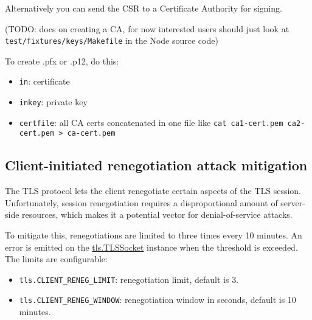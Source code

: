 Alternatively you can send the CSR to a Certificate Authority for
signing.

(TODO: docs on creating a CA, for now interested users should just look
at \texttt{test/fixtures/keys/Makefile} in the Node source code)

To create .pfx or .p12, do this:

\begin{Shaded}
\begin{Highlighting}[]
   \NormalTok{\textbackslash{}}
     
\end{Highlighting}
\end{Shaded}

\begin{itemize}
\item
  \texttt{in}: certificate
\item
  \texttt{inkey}: private key
\item
  \texttt{certfile}: all CA certs concatenated in one file like
  \texttt{cat ca1-cert.pem ca2-cert.pem \textgreater{} ca-cert.pem}
\end{itemize}

\subsection{Client-initiated renegotiation attack mitigation}

The TLS protocol lets the client renegotiate certain aspects of the TLS
session. Unfortunately, session renegotiation requires a disproportional
amount of server-side resources, which makes it a potential vector for
denial-of-service attacks.

To mitigate this, renegotiations are limited to three times every 10
minutes. An error is emitted on the
\hyperref[tls\_class\_tls\_tlssocket]{tls.TLSSocket} instance when the
threshold is exceeded. The limits are configurable:

\begin{itemize}
\item
  \texttt{tls.CLIENT\_RENEG\_LIMIT}: renegotiation limit, default is 3.
\item
  \texttt{tls.CLIENT\_RENEG\_WINDOW}: renegotiation window in seconds,
  default is 10 minutes.
\end{itemize}

